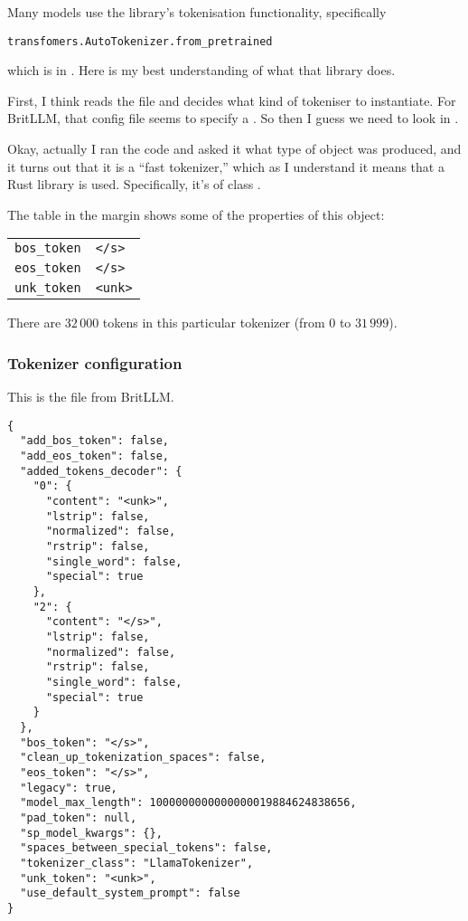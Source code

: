 \documentclass[11pt, a4paper]{article}
\begin{document}
Many models use the  library's tokenisation
functionality, specifically
\begin{verbatim}
transfomers.AutoTokenizer.from_pretrained
\end{verbatim}
which is in . Here is my best
understanding of what that library does.

First, I think  reads the file
 and decides what kind of tokeniser to
instantiate. For BritLLM, that config file seems to specify a
. So then I guess we need to look in
.

Okay, actually I ran the code and asked it what type of object was
produced, and it turns out that it is a ``fast tokenizer,'' which as I
understand it means that a Rust library is used. Specifically, it's of
class
. 

The table in the margin shows some of the properties of this object:
\begin{margintable}
\begin{tabular}{ll}
  \toprule
  \verb|bos_token| & \verb|</s>| \\
  \verb|eos_token| & \verb|</s>| \\
  \verb|unk_token| & \verb|<unk>| \\
  \bottomrule
\end{tabular}
\end{margintable}

                      
                      
                       
                      
  
There are $32\,000$ tokens in this particular tokenizer (from $0$ to $31\,999$). 

\subsubsection{Tokenizer configuration}

This is the file  from BritLLM\@.
{\small
\begin{verbatim}
{
  "add_bos_token": false,
  "add_eos_token": false,
  "added_tokens_decoder": {
    "0": {
      "content": "<unk>",
      "lstrip": false,
      "normalized": false,
      "rstrip": false,
      "single_word": false,
      "special": true
    },
    "2": {
      "content": "</s>",
      "lstrip": false,
      "normalized": false,
      "rstrip": false,
      "single_word": false,
      "special": true
    }
  },
  "bos_token": "</s>",
  "clean_up_tokenization_spaces": false,
  "eos_token": "</s>",
  "legacy": true,
  "model_max_length": 1000000000000000019884624838656,
  "pad_token": null,
  "sp_model_kwargs": {},
  "spaces_between_special_tokens": false,
  "tokenizer_class": "LlamaTokenizer",
  "unk_token": "<unk>",
  "use_default_system_prompt": false
}
\end{verbatim}}
\end{document}
